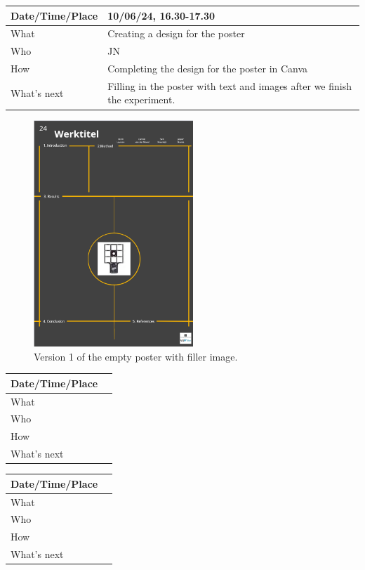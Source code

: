 \documentclass{article}
\begin{document}
\begin{table}[H]
\begin{tabular}{|p{1.5in}|p{4in}|}
\hline
Date/Time/Place & 10/06/24, 16.30-17.30 \\ \hline
What            &  Creating a design for the poster\\ \hline
Who             &  JN \\ \hline
How             &  Completing the design for the poster in Canva\\ \hline
What's next     &  Filling in the poster with text and images after we finish the experiment.\\ \hline
\end{tabular}
\end{table}

\begin{figure}[H]
    \centering
    \includegraphics[width=6cm]{PosterV1.png}
    \caption{Version 1 of the empty poster with filler image.}   
\end{figure}

\begin{table}[H]
\begin{tabular}{|p{1.5in}|p{4in}|}
\hline
Date/Time/Place &  \\ \hline
What            &  \\ \hline
Who             &  \\ \hline
How             &  \\ \hline
What's next     &  \\ \hline
\end{tabular}
\end{table}

\begin{table}[H]
\begin{tabular}{|p{1.5in}|p{4in}|}
\hline
Date/Time/Place &  \\ \hline
What            &  \\ \hline
Who             &  \\ \hline
How             &  \\ \hline
What's next     &  \\ \hline
\end{tabular}
\end{table}
\end{document}
